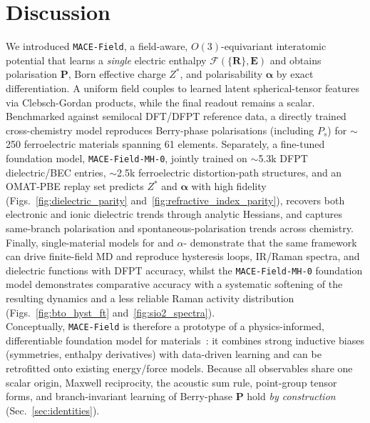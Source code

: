 \documentclass[aps,physrev,graphicx,amsmath,amssymb,
               reprint,superscriptaddress]{revtex4-2}
\begin{document}
\section{Discussion}\label{sec:discussion}

We introduced \texttt{MACE-Field}, a field-aware, $O(3)$-equivariant interatomic potential that learns a \emph{single}
electric enthalpy $\mathcal F(\{\mathbf R\},\mathbf E)$ and obtains polarisation $\mathbf P$, Born effective charge $Z^*$, and polarisability $\boldsymbol\alpha$ by exact differentiation.
A uniform field couples to learned latent spherical-tensor features via Clebsch-Gordan products, while the final readout
remains a scalar. Benchmarked against semilocal DFT/DFPT reference data, a directly trained cross-chemistry model reproduces Berry-phase
polarisations (including $P_s$) for $\sim$250 ferroelectric materials spanning 61 elements. Separately, a fine-tuned foundation model, \texttt{MACE-Field-MH-0}, jointly trained on $\sim$5.3k DFPT
dielectric/BEC entries, $\sim$2.5k ferroelectric distortion-path structures, and an OMAT-PBE replay set predicts $Z^*$ and $\boldsymbol\alpha$ with high fidelity
(Figs.~\ref{fig:dielectric_parity} and~\ref{fig:refractive_index_parity}), recovers both electronic and
ionic dielectric trends through analytic Hessians, and captures same-branch polarisation and spontaneous-polarisation trends across chemistry. Finally, single-material models for  and $\alpha$- demonstrate that the same
framework can drive finite-field MD and reproduce hysteresis loops, IR/Raman spectra, and dielectric functions with DFPT accuracy, whilst the \texttt{MACE-Field-MH-0} foundation model demonstrates comparative accuracy with a systematic softening of the resulting dynamics and a less reliable Raman activity distribution (Figs.~\ref{fig:bto_hyst_ft} and~\ref{fig:sio2_spectra}). 
\\

Conceptually, \texttt{MACE-Field} is therefore a prototype of a physics-informed, differentiable foundation model for materials~\cite{ChenOng2022,batatia2025foundationmodelatomisticmaterials}: it combines strong inductive biases (symmetries, enthalpy derivatives) with data-driven learning and can be retrofitted onto existing energy/force models. Because all observables share one scalar origin, Maxwell reciprocity, the acoustic sum
rule, point-group tensor forms, and branch-invariant learning of Berry-phase $\mathbf P$ hold \emph{by construction}
(Sec.~\ref{sec:identities}).
\\
\end{document}
